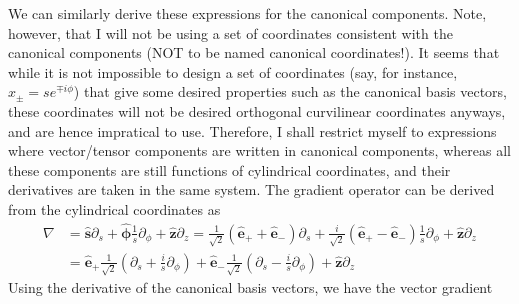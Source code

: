 We can similarly derive these expressions for the canonical components. Note, however, that I will not be using a set of coordinates consistent with the canonical components (NOT to be named canonical coordinates!). It seems that while it is not impossible to design a set of coordinates (say, for instance, $x_{\pm} = se^{\mp i\phi}$) that give some desired properties such as the canonical basis vectors, these coordinates will not be desired orthogonal curvilinear coordinates anyways, and are hence impratical to use. Therefore, I shall restrict myself to expressions where vector/tensor components are written in canonical components, whereas all these components are still functions of cylindrical coordinates, and their derivatives are taken in the same system. The gradient operator can be derived from the cylindrical coordinates as 
%
\[\begin{aligned}
    \nabla &= \hat{\mathbf{s}} \partial_s + \hat{\bm{\phi}} \frac{1}{s} \partial_\phi + \hat{\mathbf{z}}\partial_z = \frac{1}{\sqrt{2}}(\hat{\mathbf{e}}_+ + \hat{\mathbf{e}}_-) \partial_s + \frac{i}{\sqrt{2}}(\hat{\mathbf{e}}_+ - \hat{\mathbf{e}}_-) \frac{1}{s} \partial_\phi + \hat{\mathbf{z}}\partial_z \\
    &= \hat{\mathbf{e}}_+ \frac{1}{\sqrt{2}}\left(\partial_s + \frac{i}{s}\partial_\phi\right) + \hat{\mathbf{e}}_- \frac{1}{\sqrt{2}}\left(\partial_s - \frac{i}{s}\partial_\phi\right) + \hat{\mathbf{z}} \partial_z
\end{aligned}\]
%
Using the derivative of the canonical basis vectors, we have the vector gradient
%
